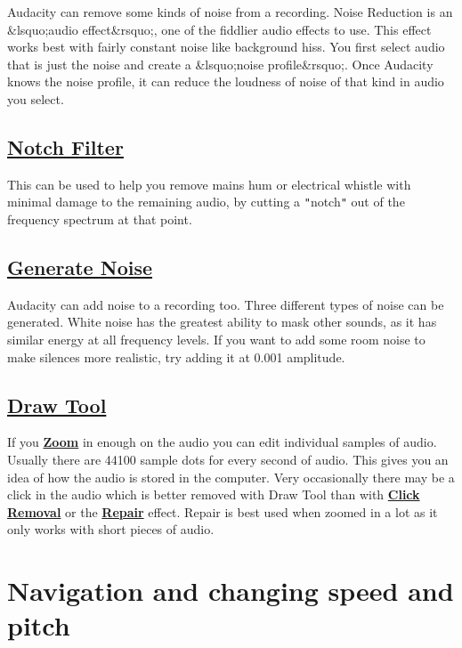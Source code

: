 \documentclass[]{book}
\begin{document}
\begin{multicols}{2}
Audacity can remove some kinds of noise from a recording.  Noise Reduction is an \&lsquo;audio effect\&rsquo;, one of the fiddlier audio effects to use.  This effect works best with fairly constant noise like background hiss.  You first select audio that is just the noise and create a \&lsquo;noise profile\&rsquo;.  Once Audacity knows the noise profile, it can reduce the loudness of noise of that kind in audio you select. 

\subsection{
\hyperref[notch_filter_]{Notch Filter}
}


This can be used to help you remove mains hum or electrical whistle with minimal damage to the remaining audio, by cutting a \texttt{{}"{}}notch\texttt{{}"{}} out of the frequency spectrum at that point.

\subsection{
\hyperref[generate_menu__noise]{Generate Noise}
}


Audacity can add noise to a recording too. Three different types of noise can be generated. White noise has the greatest ability to mask other sounds, as it has similar energy at all frequency levels. If you want to add some room noise to make silences more realistic, try adding it at 0.001 amplitude.

\subsection{
\hyperref[draw_tool_]{Draw Tool}
}


If you \textbf{
\hyperref[zooming_]{Zoom}
} in enough on the audio you can edit individual samples of audio. Usually there are 44100 sample dots for every second of audio.  This  gives you an idea of how the audio is stored in the computer.  Very occasionally there may be a click in the audio which is better removed with Draw Tool than with \textbf{
\hyperref[click_removal_]{Click Removal}
} or the \textbf{
\hyperref[repair_]{Repair}
} effect.  Repair is best used when zoomed in a lot as it only works with short pieces of audio.



\section{Navigation and changing speed and pitch}


\end{multicols}
\end{document}
